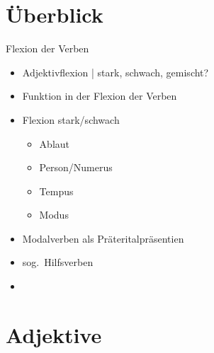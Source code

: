 \section{Überblick}

\begin{frame}
  {Flexion der Verben}
  \onslide<+->
  \begin{itemize}[<+->]
    \item Adjektivflexion | stark, schwach, gemischt?
      \Zeile
    \item Funktion in der Flexion der Verben
    \item Flexion stark\slash schwach
      \begin{itemize}[<+->]
        \item Ablaut
        \item Person\slash Numerus
        \item Tempus
        \item Modus
      \end{itemize}
    \item Modalverben als Präteritalpräsentien
    \item sog.\ Hilfsverben
    \Zeile
    \item \citet[Kapitel~9, 10]{Schaefer2018b}
  \end{itemize}
\end{frame}

\section{Adjektive}

